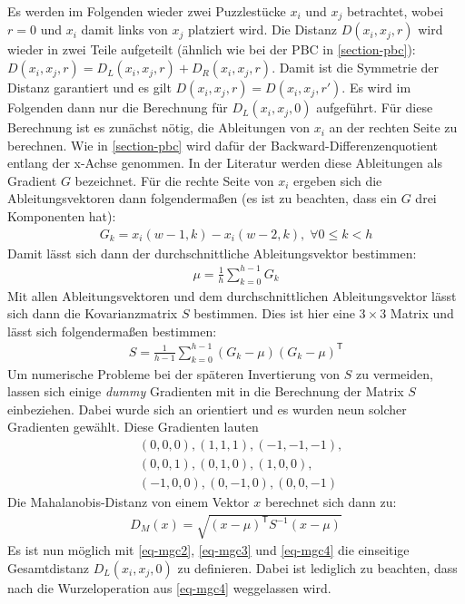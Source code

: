 \documentclass{whswinvcbook}
\begin{document}
Es werden im Folgenden wieder zwei Puzzlestücke $x_i$ und $x_j$ betrachtet, wobei $r=0$ und $x_i$ damit links von $x_j$ platziert wird. Die Distanz $D(x_i,x_j,r)$ wird wieder in zwei Teile aufgeteilt (ähnlich wie bei der PBC in \ref{section-pbc}): $D(x_i,x_j,r)=D_L(x_i,x_j,r)+D_R(x_i,x_j,r)$. Damit ist die Symmetrie der Distanz garantiert und es gilt $D(x_i,x_j,r)=D(x_i,x_j,r')$. Es wird im Folgenden dann nur die Berechnung für $D_L(x_i,x_j,0)$ aufgeführt. Für diese Berechnung ist es zunächst nötig, die Ableitungen von $x_i$ an der rechten Seite zu berechnen. Wie in \ref{section-pbc} wird dafür der Backward-Differenzenquotient entlang der x-Achse genommen. In der Literatur werden diese Ableitungen als Gradient $G$ bezeichnet. Für die rechte Seite von $x_i$ ergeben sich die Ableitungsvektoren dann folgendermaßen (es ist zu beachten, dass ein $G$ drei Komponenten hat):
\begin{align}\label{eq-mgc1}
    G_k=x_i(w-1,k)-x_i(w-2,k),\;\forall 0\leq k<h
\end{align}
Damit lässt sich dann der durchschnittliche Ableitungsvektor bestimmen:
\begin{align}\label{eq-mgc2}
    \mu=\frac{1}{h}\sum_{k=0}^{h-1}G_k
\end{align}
Mit allen Ableitungsvektoren und dem durchschnittlichen Ableitungsvektor lässt sich dann die Kovarianzmatrix $S$ bestimmen. Dies ist hier eine $3\times3$ Matrix und lässt sich folgendermaßen bestimmen:
\begin{align}\label{eq-mgc3}
    S=\frac{1}{h-1}\sum_{k=0}^{h-1}(G_k-\mu)(G_k-\mu)^\mathsf{T}
\end{align}
Um numerische Probleme bei der späteren Invertierung von $S$ zu vermeiden, lassen sich einige \textit{dummy} Gradienten mit in die Berechnung der Matrix $S$ einbeziehen. Dabei wurde sich an \cite{gallagher,crisjim} orientiert und es wurden neun solcher Gradienten gewählt. Diese Gradienten lauten
\begin{align*}
    &(0,0,0),(1,1,1),(-1,-1,-1),\\
    &(0,0,1),(0,1,0),(1,0,0),\\
    &(-1,0,0),(0,-1,0),(0,0,-1)
\end{align*}
Die Mahalanobis-Distanz von einem Vektor $x$ berechnet sich dann zu:
\begin{align}\label{eq-mgc4}
    D_M(x)=\sqrt{(x-\mu)^\mathsf{T}S^{-1}(x-\mu)}
\end{align}
Es ist nun möglich mit \ref{eq-mgc2}, \ref{eq-mgc3} und \ref{eq-mgc4} die einseitige Gesamtdistanz $D_L(x_i,x_j,0)$ zu definieren. Dabei ist lediglich zu beachten, dass nach \cite{gallagher} die Wurzeloperation aus \ref{eq-mgc4} weggelassen wird.
\end{document}
